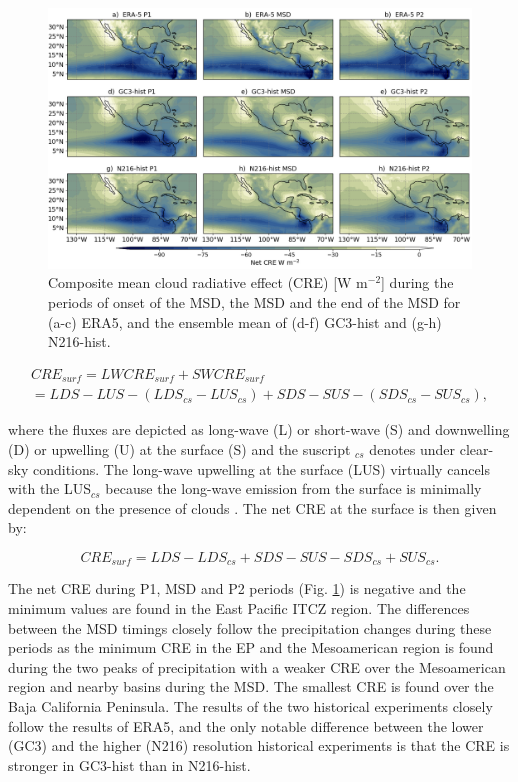\begin{figure}[b!]
\includegraphics[width=\linewidth]{figures/fig4_creclim_3.png}
\caption[Composites of cloud radiative effects]{Composite mean cloud radiative effect (CRE) [W m$^{-2}$] during the periods of onset of the MSD, the MSD and the end of the MSD for (a-c) ERA5, and the ensemble mean of (d-f) GC3-hist and (g-h) N216-hist.}
\label{fig:cre_comp}
\end{figure}

\begin{multline}
CRE_{surf}=LW CRE_{surf} +SW CRE_{surf} \\ = LDS-LUS -(LDS_{cs}-LUS_{cs})+SDS-SUS-(SDS_{cs}-SUS_{cs}),
\end{multline}

\noindent where the fluxes are depicted as long-wave (L) or short-wave (S) and downwelling (D) or upwelling (U) at the surface (S) and the suscript $_{cs}$ denotes under clear-sky conditions. The long-wave upwelling at the surface (LUS) virtually cancels with the LUS$_{cs}$ because the long-wave emission from the surface is minimally dependent on the presence of clouds \citep{allan2011}. The net CRE at the surface is then given by:


\begin{equation}
CRE_{surf}=  LDS-LDS_{cs}+SDS-SUS-SDS_{cs}+SUS_{cs}.
\end{equation}



The net CRE during P1, MSD and P2 periods (Fig. \ref{fig:cre_comp}) is negative  and the minimum values are found in the East Pacific ITCZ region. The differences between the MSD timings closely follow the precipitation changes during these periods as the minimum CRE in the EP and the Mesoamerican region is found during the two peaks of precipitation with a weaker CRE over the Mesoamerican region and nearby basins during the MSD. The smallest CRE is found over the Baja California Peninsula. 
The results of the two historical experiments closely follow the results of ERA5, and the only notable difference between the lower (GC3) and the higher (N216) resolution historical experiments is that the CRE is stronger in GC3-hist than in N216-hist.

